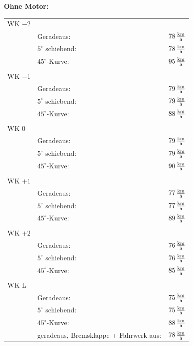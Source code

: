 \textbf{Ohne Motor:}

\begin{longtable}{l l l}
WK $-2$ & & \\
& Geradeaus: & $\unit[78]{\frac{km}{h}}$\\
& $5^{\circ}$ schiebend: & $\unit[78]{\frac{km}{h}}$\\
& $45^{\circ}$-Kurve: & $\unit[95]{\frac{km}{h}}$\\
\hline
& &  \\
WK $-1$ & & \\
& Geradeaus: & $\unit[79]{\frac{km}{h}}$\\
& $5^{\circ}$ schiebend: & $\unit[79]{\frac{km}{h}}$\\
& $45^{\circ}$-Kurve: & $\unit[88]{\frac{km}{h}}$\\
\hline
& &  \\
WK $0$ & & \\
& Geradeaus: & $\unit[79]{\frac{km}{h}}$\\
& $5^{\circ}$ schiebend: & $\unit[79]{\frac{km}{h}}$\\
& $45^{\circ}$-Kurve: & $\unit[90]{\frac{km}{h}}$\\
\hline
& &  \\
WK $+1$ & & \\
& Geradeaus: & $\unit[77]{\frac{km}{h}}$\\
& $5^{\circ}$ schiebend: & $\unit[77]{\frac{km}{h}}$\\
& $45^{\circ}$-Kurve: & $\unit[89]{\frac{km}{h}}$\\
\hline
 & & \\
WK $+2$ & & \\
& Geradeaus: & $\unit[76]{\frac{km}{h}}$\\
& $5^{\circ}$ schiebend: & $\unit[76]{\frac{km}{h}}$\\
& $45^{\circ}$-Kurve: & $\unit[85]{\frac{km}{h}}$\\
\hline
& &  \\
WK L& & \\
& Geradeaus: & $\unit[75]{\frac{km}{h}}$\\
& $5^{\circ}$ schiebend: & $\unit[75]{\frac{km}{h}}$\\
& $45^{\circ}$-Kurve: & $\unit[88]{\frac{km}{h}}$\\
& geradeaus, Bremsklappe + Fahrwerk aus: & $\unit[78]{\frac{km}{h}}$ \\
\end{longtable}

